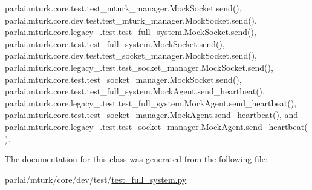 parlai.\+mturk.\+core.\+test.\+test\+\_\+mturk\+\_\+manager.\+Mock\+Socket.\+send(), parlai.\+mturk.\+core.\+dev.\+test.\+test\+\_\+mturk\+\_\+manager.\+Mock\+Socket.\+send(), parlai.\+mturk.\+core.\+legacy\+\_.\+test.\+test\+\_\+full\+\_\+system.\+Mock\+Socket.\+send(), parlai.\+mturk.\+core.\+test.\+test\+\_\+full\+\_\+system.\+Mock\+Socket.\+send(), parlai.\+mturk.\+core.\+dev.\+test.\+test\+\_\+socket\+\_\+manager.\+Mock\+Socket.\+send(), parlai.\+mturk.\+core.\+legacy\+\_.\+test.\+test\+\_\+socket\+\_\+manager.\+Mock\+Socket.\+send(), parlai.\+mturk.\+core.\+test.\+test\+\_\+socket\+\_\+manager.\+Mock\+Socket.\+send(), parlai.\+mturk.\+core.\+test.\+test\+\_\+full\+\_\+system.\+Mock\+Agent.\+send\+\_\+heartbeat(), parlai.\+mturk.\+core.\+legacy\+\_.\+test.\+test\+\_\+full\+\_\+system.\+Mock\+Agent.\+send\+\_\+heartbeat(), parlai.\+mturk.\+core.\+test.\+test\+\_\+socket\+\_\+manager.\+Mock\+Agent.\+send\+\_\+heartbeat(), and parlai.\+mturk.\+core.\+legacy\+\_.\+test.\+test\+\_\+socket\+\_\+manager.\+Mock\+Agent.\+send\+\_\+heartbeat().



The documentation for this class was generated from the following file\+:\begin{DoxyCompactItemize}
\item 
parlai/mturk/core/dev/test/\hyperlink{dev_2test_2test__full__system_8py}{test\+\_\+full\+\_\+system.\+py}\end{DoxyCompactItemize}

